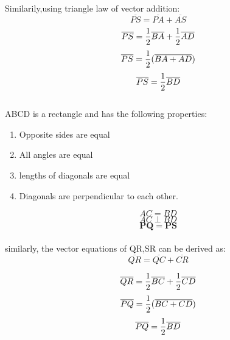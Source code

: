 \documentclass[journal,10pt,twocolumn]{article}
\begin{document}
Similarily,using triangle law of vector addition:
\begin{equation}
	\overline{PS}= \overline{PA} + \overline{AS} 
\end{equation}
\begin{equation}
		  \overline{PS}  = \frac{1}{2}\overline{BA} + \frac{1}{2}\overline{AD} \\
\end{equation}
\begin{equation}
	\overline{PS} =\frac{1}{2}(\overline{BA+AD})\\
\end{equation}
\begin{equation}
	  \overline{PS} =\frac{1}{2}\overline{BD} \\
\end{equation}
\\ABCD is a rectangle and has the following properties:
\begin{enumerate}
	\item Opposite sides are equal
\item All angles are equal
\item lengths of diagonals are equal
\item Diagonals are perpendicular to each other.
\end{enumerate}
	\begin{equation}
AC = BD 
	\end{equation}
	\begin{equation}
		AC \perp BD
	\end{equation}
	\begin{equation}
		\boldsymbol{PQ} = \boldsymbol{PS}
	\end{equation}
\\ similarly, the vector equations of QR,SR can be derived as:
\begin{equation}
	\overline{QR}= \overline{QC} + \overline{CR} 
\end{equation}
	
\begin{equation}
		  \overline{QR}  = \frac{1}{2}\overline{BC} + \frac{1}{2}\overline{CD} \\
\end{equation}
\begin{equation}
	\overline{PQ} =\frac{1}{2}(\overline{BC+CD})\\
\end{equation}
\begin{equation}
	  \overline{PQ} =\frac{1}{2}\overline{BD} \\
\end{equation}
\end{document}
